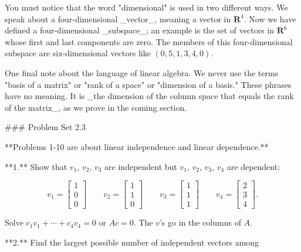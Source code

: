 You must notice that the word "dimensional" is used in two different ways. We speak about a four-dimensional _vector_, meaning a vector in \(\mathbf{R}^{4}\). Now we have defined a four-dimensional _subspace_; an example is the set of vectors in \(\mathbf{R}^{6}\) whose first and last components are zero. The members of this four-dimensional subspace are six-dimensional vectors like \((0,5,1,3,4,0)\).

One final note about the language of linear algebra. We never use the terms "basis of a matrix" or "rank of a space" or "dimension of a basis." These phrases have no meaning. It is _the dimension of the column space that equals the rank of the matrix_, as we prove in the coming section.

### Problem Set 2.3

**Problems 1-10 are about linear independence and linear dependence.**

**1.** Show that \(v_{1}\), \(v_{2}\), \(v_{3}\) are independent but \(v_{1}\), \(v_{2}\), \(v_{3}\), \(v_{4}\) are dependent:

\[v_{1}=\begin{bmatrix}1\\ 0\\ 0\end{bmatrix}\qquad v_{2}=\begin{bmatrix}1\\ 1\\ 0\end{bmatrix}\qquad v_{3}=\begin{bmatrix}1\\ 1\\ 1\end{bmatrix}\qquad v_{4}=\begin{bmatrix}2\\ 3\\ 4\end{bmatrix}.\]

Solve \(c_{1}v_{1}+\cdots+c_{4}v_{4}=0\) or \(Ac=0\). The \(v\)'s go in the columns of \(A\).

**2.** Find the largest possible number of independent vectors among

